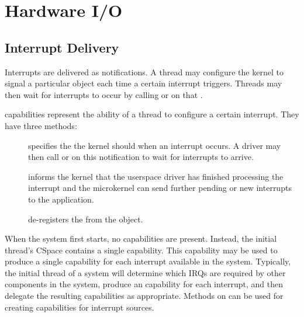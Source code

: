 %
%
%
%

\chapter{\label{ch:io}Hardware I/O}

\section{Interrupt Delivery}
\label{sec:interrupts}

Interrupts are delivered as notifications. A thread
may configure the kernel to signal a particular 
object each time a certain interrupt triggers. Threads may then wait for
interrupts to occur by calling  or
 on
that .


 capabilities represent the ability of a thread to
configure a certain interrupt. They have three methods:

\begin{description}
    \item[]
    specifies the  the kernel should
     when an interrupt occurs. A driver
    may then call  or 
    on this notification to
    wait for interrupts to arrive.

    \item[]
    informs the kernel that the userspace driver has finished processing
    the interrupt and the microkernel can send further pending or new
    interrupts to the application.

    \item[]
    de-registers the  from the  object.
\end{description}

When the system first starts, no  capabilities are
present. Instead, the initial thread's CSpace contains a single
 capability. This capability may be used to produce
a single  capability for each interrupt available in the
system. Typically, the initial thread of a system will determine which
IRQs are required by other components in the system, produce an
 capability for each interrupt, and then delegate the
resulting capabilities as appropriate. Methods on  can
be used for creating  capabilities for interrupt sources.

